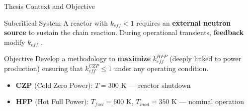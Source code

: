 \documentclass[aspectratio=169]{beamer}
\begin{document}
\begin{frame}{Thesis Context and Objective}
    \begin{block}{Subcritical System}
        A reactor with $k_{eff} < 1$ requires an \textbf{external neutron source} to sustain the chain reaction. During operational transients, \textbf{feedback} modify $k_{eff}$ .
    \end{block}
    
    \vspace{0.5cm}
    
    \begin{alertblock}{Objective}
        Develop a methodology to \textbf{maximize} $k_{eff}^{HFP}$ (deeply linked to power production) ensuring that $k_{eff}^{CZP} \leq 1$ under any operating condition.
    \end{alertblock}
    
    \vspace{0.3cm}
    
    \begin{itemize}
        \item \textbf{CZP} (Cold Zero Power): $T = 300$ K — reactor shutdown
        \item \textbf{HFP} (Hot Full Power): $T_{fuel} = 600$ K, $T_{mod} = 350$ K — nominal operation 
    \end{itemize}
\end{frame}
\end{document}
